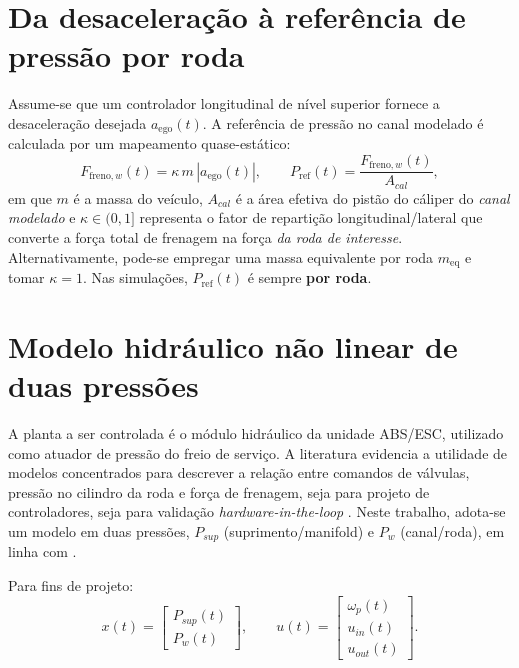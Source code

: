 \section{Da desaceleração à referência de pressão por roda}
\label{sec:mapeamento-aref-pressao}

Assume-se que um controlador longitudinal de nível superior fornece a desaceleração desejada $a_{\mathrm{ego}}(t)$. A referência de pressão no canal modelado é calculada por um mapeamento quase-estático:
\begin{equation}
    F_{\mathrm{freno},w}(t) = \kappa\, m\,|a_{\mathrm{ego}}(t)|,
    \qquad
    P_{\mathrm{ref}}(t) = \frac{F_{\mathrm{freno},w}(t)}{A_{cal}},
    \label{eq:mapeamento_aref_pressao}
\end{equation}
em que $m$ é a massa do veículo, $A_{cal}$ é a área efetiva do pistão do cáliper do \emph{canal modelado} e $\kappa\in(0,1]$ representa o fator de repartição longitudinal/lateral que converte a força total de frenagem na força \emph{da roda de interesse}. Alternativamente, pode-se empregar uma massa equivalente por roda $m_{\mathrm{eq}}$ e tomar $\kappa=1$. Nas simulações, $P_{\mathrm{ref}}(t)$ é sempre \textbf{por roda}.

\section{Modelo hidráulico não linear de duas pressões}
\label{sec:controle-4-1}

A planta a ser controlada é o módulo hidráulico da unidade ABS/ESC, utilizado como atuador de pressão do freio de serviço. A literatura evidencia a utilidade de modelos concentrados para descrever a relação entre comandos de válvulas, pressão no cilindro da roda e força de frenagem, seja para projeto de controladores, seja para validação \emph{hardware-in-the-loop} \cite{HouhuaJing2022,PressureCoordinatedControl2023,ZengYangHuang2023,MotorParametricDesign2023}. Neste trabalho, adota-se um modelo em duas pressões, $P_{sup}$ (suprimento/manifold) e $P_w$ (canal/roda), em linha com .

Para fins de projeto:
\begin{equation}
    x(t) = 
    \begin{bmatrix}
        P_{sup}(t) \\[2pt]
        P_{w}(t)
    \end{bmatrix},
    \qquad
    u(t) =
    \begin{bmatrix}
        \omega_p(t) \\[2pt]
        u_{in}(t) \\[2pt]
        u_{out}(t)
    \end{bmatrix}.
    \label{eq:vect-estados-hidraulico}
\end{equation}

